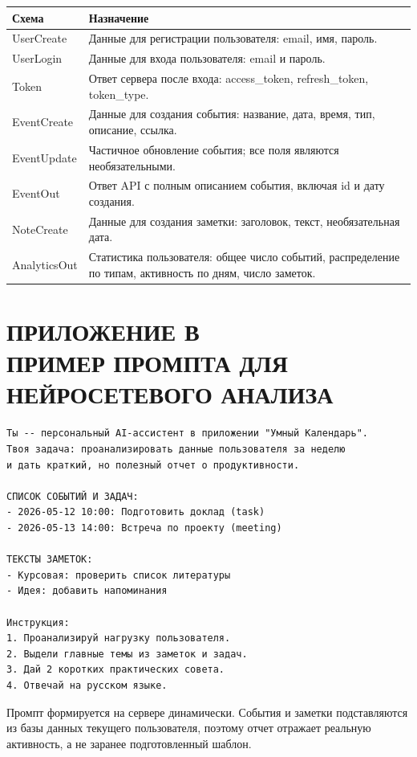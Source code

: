 \documentclass[14pt,a4paper]{extreport}
\begin{document}
\begin{longtable}{|p{}|p{}|}
\hline
\textbf{Схема} & \textbf{Назначение}\\
\hline
UserCreate & Данные для регистрации пользователя: email, имя, пароль.\\
\hline
UserLogin & Данные для входа пользователя: email и пароль.\\
\hline
Token & Ответ сервера после входа: access\_token, refresh\_token, token\_type.\\
\hline
EventCreate & Данные для создания события: название, дата, время, тип, описание, ссылка.\\
\hline
EventUpdate & Частичное обновление события; все поля являются необязательными.\\
\hline
EventOut & Ответ API с полным описанием события, включая id и дату создания.\\
\hline
NoteCreate & Данные для создания заметки: заголовок, текст, необязательная дата.\\
\hline
AnalyticsOut & Статистика пользователя: общее число событий, распределение по типам, активность по дням, число заметок.\\
\hline
\end{longtable}

\chapter*{ПРИЛОЖЕНИЕ В\\ПРИМЕР ПРОМПТА ДЛЯ НЕЙРОСЕТЕВОГО АНАЛИЗА}

\begin{Verbatim}[fontsize=\small]
Ты -- персональный AI-ассистент в приложении "Умный Календарь".
Твоя задача: проанализировать данные пользователя за неделю
и дать краткий, но полезный отчет о продуктивности.

СПИСОК СОБЫТИЙ И ЗАДАЧ:
- 2026-05-12 10:00: Подготовить доклад (task)
- 2026-05-13 14:00: Встреча по проекту (meeting)

ТЕКСТЫ ЗАМЕТОК:
- Курсовая: проверить список литературы
- Идея: добавить напоминания

Инструкция:
1. Проанализируй нагрузку пользователя.
2. Выдели главные темы из заметок и задач.
3. Дай 2 коротких практических совета.
4. Отвечай на русском языке.
\end{Verbatim}

Промпт формируется на сервере динамически. События и заметки подставляются из базы данных текущего пользователя, поэтому отчет отражает реальную активность, а не заранее подготовленный шаблон.
\end{document}
